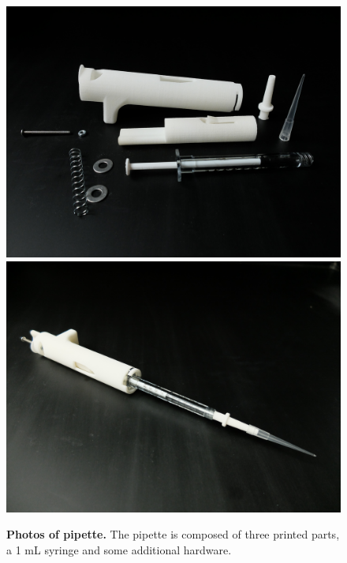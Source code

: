 \documentclass[]{article}
\begin{document}
\begin{figure}
\includegraphics[scale=0.04]{pipette-disassembled.JPG} %
\includegraphics[scale=0.04]{pipette-assembled.JPG} %
\caption{
{\bf Photos of pipette.}  The pipette is composed of three printed parts, a 1 mL syringe and some additional hardware.  
}
\label{photo-parts-figure}
\end{figure}




\end{document}
